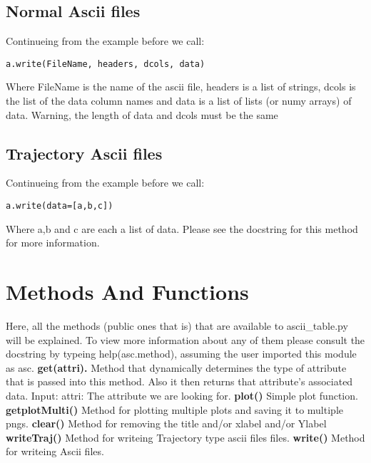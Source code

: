 \subsection{Normal Ascii files}
Continueing from the example before we call:
\begin{verbatim}
a.write(FileName, headers, dcols, data)
\end{verbatim}
Where FileName is the name of the ascii file, headers is a list of strings, dcols
is the list of the data column names and data is a list of lists (or numy arrays)
of data. Warning, the length of data and dcols must be the same
\subsection{Trajectory Ascii files}
Continueing from the example before we call:
\begin{verbatim}
a.write(data=[a,b,c])
\end{verbatim}
Where a,b and c are each a list of data. Please see the docstring for this method
for more information.
\section{Methods And Functions}
Here, all the methods (public ones that is) that are available to ascii\_table.py will be explained.
To view more information about any of them please consult the docstring by typeing help(asc.method), assuming
the user imported this module as asc.
\newline\newline
{\bf get(attri).}
\newline  
Method that dynamically determines the type of attribute that is passed into this method. Also it then returns that attribute's
associated data.\newline
Input:\newline
attri: The attribute we are looking for.\newline
{\bf plot()}\newline 
Simple plot function.\newline
{\bf getplotMulti()}\newline 
Method for plotting multiple plots and saving it to multiple pngs.\newline
{\bf clear()}\newline 
Method for removing the title and/or xlabel and/or Ylabel \newline\newline
{\bf writeTraj()}\newline 
Method for writeing Trajectory type ascii files files.\newline\newline
{\bf write()}\newline 
Method for writeing Ascii files. \newline\newline
